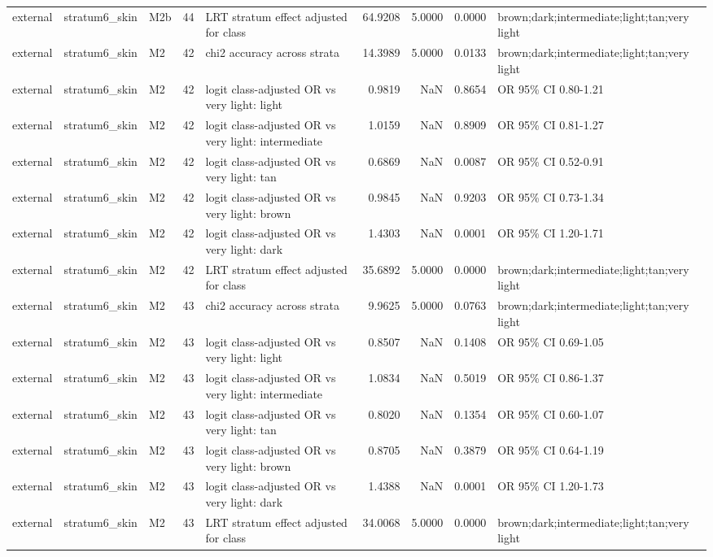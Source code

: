 \begin{tabular}{lllrlrrrl}
external & stratum6\_skin & M2b & 44 & LRT stratum effect adjusted for class & 64.9208 & 5.0000 & 0.0000 & brown;dark;intermediate;light;tan;very light \\
external & stratum6\_skin & M2 & 42 & chi2 accuracy across strata & 14.3989 & 5.0000 & 0.0133 & brown;dark;intermediate;light;tan;very light \\
external & stratum6\_skin & M2 & 42 & logit class-adjusted OR vs very light: light & 0.9819 & NaN & 0.8654 & OR 95\% CI 0.80-1.21 \\
external & stratum6\_skin & M2 & 42 & logit class-adjusted OR vs very light: intermediate & 1.0159 & NaN & 0.8909 & OR 95\% CI 0.81-1.27 \\
external & stratum6\_skin & M2 & 42 & logit class-adjusted OR vs very light: tan & 0.6869 & NaN & 0.0087 & OR 95\% CI 0.52-0.91 \\
external & stratum6\_skin & M2 & 42 & logit class-adjusted OR vs very light: brown & 0.9845 & NaN & 0.9203 & OR 95\% CI 0.73-1.34 \\
external & stratum6\_skin & M2 & 42 & logit class-adjusted OR vs very light: dark & 1.4303 & NaN & 0.0001 & OR 95\% CI 1.20-1.71 \\
external & stratum6\_skin & M2 & 42 & LRT stratum effect adjusted for class & 35.6892 & 5.0000 & 0.0000 & brown;dark;intermediate;light;tan;very light \\
external & stratum6\_skin & M2 & 43 & chi2 accuracy across strata & 9.9625 & 5.0000 & 0.0763 & brown;dark;intermediate;light;tan;very light \\
external & stratum6\_skin & M2 & 43 & logit class-adjusted OR vs very light: light & 0.8507 & NaN & 0.1408 & OR 95\% CI 0.69-1.05 \\
external & stratum6\_skin & M2 & 43 & logit class-adjusted OR vs very light: intermediate & 1.0834 & NaN & 0.5019 & OR 95\% CI 0.86-1.37 \\
external & stratum6\_skin & M2 & 43 & logit class-adjusted OR vs very light: tan & 0.8020 & NaN & 0.1354 & OR 95\% CI 0.60-1.07 \\
external & stratum6\_skin & M2 & 43 & logit class-adjusted OR vs very light: brown & 0.8705 & NaN & 0.3879 & OR 95\% CI 0.64-1.19 \\
external & stratum6\_skin & M2 & 43 & logit class-adjusted OR vs very light: dark & 1.4388 & NaN & 0.0001 & OR 95\% CI 1.20-1.73 \\
external & stratum6\_skin & M2 & 43 & LRT stratum effect adjusted for class & 34.0068 & 5.0000 & 0.0000 & brown;dark;intermediate;light;tan;very light \\

\end{tabular}
